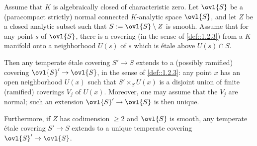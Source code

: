 %
%
%


\begin{thm}\label{thm::2.1.10} Assume that $K$ is algebraically closed
 of characteristic zero. Let $\ovl{S}$ be  
 a (paracompact strictly) {\rm normal} connected $K$-analytic space
 $\ovl{S}$, and let $Z$ be a closed analytic subset such 
 that $S:=\ovl{S}\setminus Z$ is smooth.
 Assume that for any point $s$ of $\ovl{S}$, there is a covering (in the
 sense of \ref{def::1.2.3}) from a $K$-manifold 
 onto a neighborhood $U(s)$ of $s$ which is \'etale above $U(s)\cap S$. 

 \noindent
 Then any temperate \'etale covering $S'\to S $ extends to
 a (possibly ramified) covering  
 $\ovl{S}'\to \ovl{S}$, in the sense of \ref{def::1.2.3}: any point $x$
 has an open neighborhood $U(x)$ such that $S'\times_S U(x)$ 
 is a disjoint union of finite (ramified) coverings $V_j$ of
 $U(x)$. Moreover, one may assume that the $V_j$ are normal; 
 such an extension
 $\ovl{S}'\to \ovl{S}$ is then unique. 

 Furthermore, if $Z$ has codimension $\geq 2$ and $\ovl{S}$
 is smooth, any temperate
 \'etale covering $S'\to S $ extends to a unique temperate covering
 $\ovl{S}'\to \ovl{S}$.
\end{thm}


